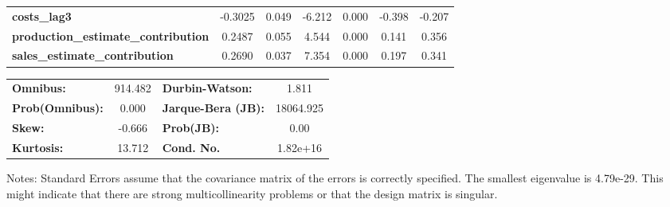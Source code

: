 \begin{center}
\begin{tabular}{lcccccc}
\textbf{costs\_lag3}                        &      -0.3025  &        0.049     &    -6.212  &         0.000        &       -0.398    &       -0.207     \\
\textbf{production\_estimate\_contribution} &       0.2487  &        0.055     &     4.544  &         0.000        &        0.141    &        0.356     \\
\textbf{sales\_estimate\_contribution}      &       0.2690  &        0.037     &     7.354  &         0.000        &        0.197    &        0.341     \\
\bottomrule
\end{tabular}
\begin{tabular}{lclc}
\textbf{Omnibus:}       & 914.482 & \textbf{  Durbin-Watson:     } &     1.811  \\
\textbf{Prob(Omnibus):} &   0.000 & \textbf{  Jarque-Bera (JB):  } & 18064.925  \\
\textbf{Skew:}          &  -0.666 & \textbf{  Prob(JB):          } &      0.00  \\
\textbf{Kurtosis:}      &  13.712 & \textbf{  Cond. No.          } &  1.82e+16  \\
\bottomrule
\end{tabular}
\end{center}

Notes: \newline
 [1] Standard Errors assume that the covariance matrix of the errors is correctly specified. \newline
 [2] The smallest eigenvalue is 4.79e-29. This might indicate that there are \newline
 strong multicollinearity problems or that the design matrix is singular.